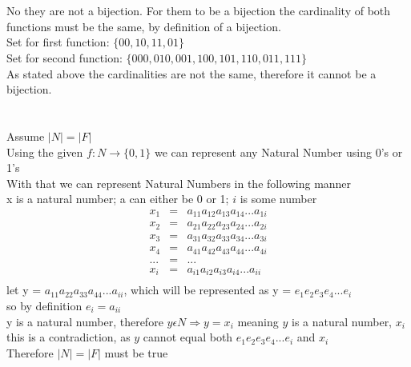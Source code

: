 \documentclass[letterpaper]{article}
\begin{document}
    \section{}
    	No they are not a bijection.  For them to be a bijection the cardinality of both functions must be the same, by definition of a bijection.  \\
       	Set for first function: $\{00, 10, 11, 01\}$ \\
        Set for second function: $\{000, 010, 001, 100, 101, 110, 011, 111\}$ \\
        As stated above the cardinalities are not the same, therefore it cannot be a bijection.
    \section{}
    	\subsection{}
            Assume $|N| = |F|$ \\
            Using the given $f: N \rightarrow \{0, 1\}$ we can represent any Natural Number using 0's or 1's\\
            With that we can represent Natural Numbers in the following manner \\
            x is a natural number; a can either be 0 or 1; $i$ is some number \\
            \begin{displaymath}
                \begin{array}{lll}
                    x_1 & = & a_{11}a_{12}a_{13}a_{14}...a_{1i}\\
                    x_2 & = & a_{21}a_{22}a_{23}a_{24}...a_{2i}\\
                    x_3 & = & a_{31}a_{32}a_{33}a_{34}...a_{3i}\\
                    x_4 & = & a_{41}a_{42}a_{43}a_{44}...a_{4i}\\
                    ... & = & ... \\
                    x_i & = & a_{i1}a_{i2}a_{i3}a_{i4}...a_{ii}\\
                \end{array}
            \end{displaymath}
            let y = $a_{11}a_{22}a_{33}a_{44}...a_{ii}$, which will be represented as y = $e_1 e_2 e_3 e_4 ... e_i$ \\
            so by definition $e_i = a_{ii}$\\
            y is a natural number, therefore $y\epsilon N \Rightarrow y = x_i$ meaning $y$ is a natural number, $x_i$\\
            this is a contradiction, as $y$ cannot equal both $e_1 e_2 e_3 e_4 ... e_i$ and $x_i$ \\
            Therefore $|N| = |F|$ must be true\\
\end{document}
